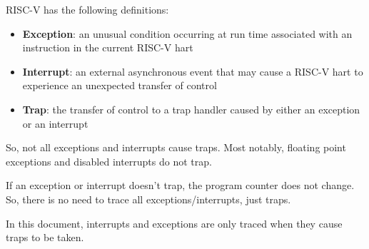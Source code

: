 RISC-V has the following definitions:
\begin{itemize}
  \item
    \textbf{Exception}: an unusual condition occurring at run time associated with an instruction in the current RISC-V hart
  \item
    \textbf{Interrupt}: an external asynchronous event that may cause a RISC-V hart to experience an unexpected transfer of control
  \item
    \textbf{Trap}: the transfer of control to a trap handler caused by either an exception or an interrupt
\end{itemize}
So, not all exceptions and interrupts cause traps. Most notably, floating point exceptions and disabled interrupts do not trap.

If an exception or interrupt doesn't trap, the program counter does not
change. So, there is no need to trace all exceptions/interrupts, just
traps.

In this document, interrupts and exceptions are only traced when they cause traps to be taken.
